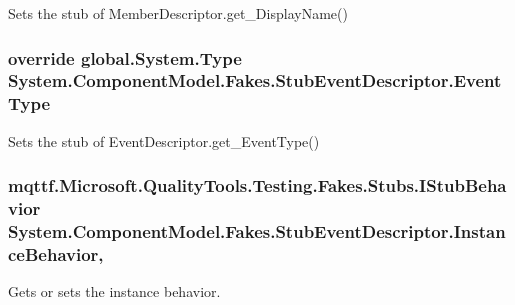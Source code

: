 Sets the stub of Member\-Descriptor.\-get\-\_\-\-Display\-Name()

\hypertarget{class_system_1_1_component_model_1_1_fakes_1_1_stub_event_descriptor_ac8ab747c376096d2298f4d84d834a621}{
\subsubsection[{Event\-Type}]{\setlength{\rightskip}{0pt plus 5cm}override global.\-System.\-Type System.\-Component\-Model.\-Fakes.\-Stub\-Event\-Descriptor.\-Event\-Type\hspace{0.3cm}{\ttfamily [get]}}}\label{class_system_1_1_component_model_1_1_fakes_1_1_stub_event_descriptor_ac8ab747c376096d2298f4d84d834a621}


Sets the stub of Event\-Descriptor.\-get\-\_\-\-Event\-Type()

\hypertarget{class_system_1_1_component_model_1_1_fakes_1_1_stub_event_descriptor_acf3fa5e853b89ac6dfb0ddba22cc33fd}{
\subsubsection[{Instance\-Behavior}]{\setlength{\rightskip}{0pt plus 5cm}mqttf.\-Microsoft.\-Quality\-Tools.\-Testing.\-Fakes.\-Stubs.\-I\-Stub\-Behavior System.\-Component\-Model.\-Fakes.\-Stub\-Event\-Descriptor.\-Instance\-Behavior\hspace{0.3cm}{\ttfamily [get]}, {\ttfamily [set]}}}\label{class_system_1_1_component_model_1_1_fakes_1_1_stub_event_descriptor_acf3fa5e853b89ac6dfb0ddba22cc33fd}


Gets or sets the instance behavior.

